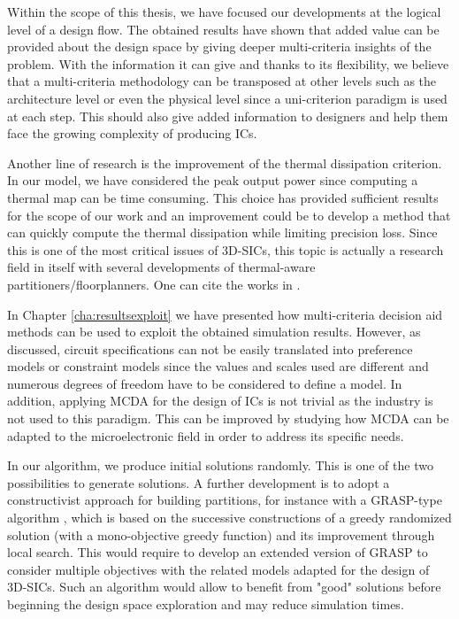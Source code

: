 Within the scope of this thesis, we have focused our developments at the logical level of a design flow. The obtained results have shown that added value can be provided about the design space by giving deeper multi-criteria insights of the problem. With the information it can give and thanks to its flexibility, we believe that a multi-criteria methodology can be transposed at other levels such as the architecture level or even the physical level since a uni-criterion paradigm is used at each step. This should also give added information to designers and help them face the growing complexity of producing ICs.

Another line of research is the improvement of the thermal dissipation criterion. In our model, we have considered the peak output power since computing a thermal map can be time consuming. This choice has provided sufficient results for the scope of our work and an improvement could be to develop a method that can quickly compute the thermal dissipation while limiting precision loss. Since this is one of the most critical issues of 3D-SICs, this topic is actually a research field in itself with several developments of thermal-aware partitioners/floorplanners. One can cite the works in \cite{1594713,1112292,1486402}.

In Chapter \ref{cha:resultsexploit} we have presented how multi-criteria decision aid methods can be used to exploit the obtained simulation results. However, as discussed, circuit specifications can not be easily translated into preference models or constraint models since the values and scales used are different and numerous degrees of freedom have to be considered to define a model. In addition, applying MCDA for the design of ICs is not trivial as the industry is not used to this paradigm. This can be improved by studying how MCDA can be adapted to the microelectronic field in order to address its specific needs. %

In our algorithm, we produce initial solutions randomly. This is one of the two possibilities to generate solutions. A further development is to adopt a constructivist approach for building partitions, for instance with a GRASP-type algorithm \cite{HarSho87a,DBLP:dblp_conf/sccc/ViannaAVA05}, which is based on the successive constructions of a greedy randomized solution (with a mono-objective greedy function) and its improvement through local search. This would require to develop an extended version of GRASP to consider multiple objectives with the related models adapted for the design of 3D-SICs. Such an algorithm would allow to benefit from "good" solutions before beginning the design space exploration and may reduce simulation times.

